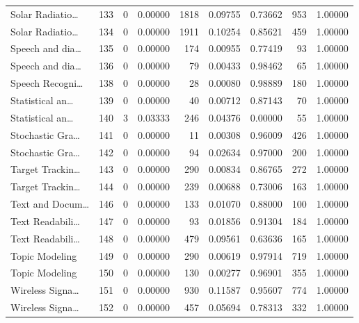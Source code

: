 \begin{table}
\begin{tabular}{lrrrrrrrr}
Solar Radiatio… & 133 & 0 & 0.00000 & 1818 & 0.09755 & 0.73662 & 953 & 1.00000 \\
Solar Radiatio… & 134 & 0 & 0.00000 & 1911 & 0.10254 & 0.85621 & 459 & 1.00000 \\
Speech and dia… & 135 & 0 & 0.00000 & 174 & 0.00955 & 0.77419 & 93 & 1.00000 \\
Speech and dia… & 136 & 0 & 0.00000 & 79 & 0.00433 & 0.98462 & 65 & 1.00000 \\
Speech Recogni… & 138 & 0 & 0.00000 & 28 & 0.00080 & 0.98889 & 180 & 1.00000 \\
Statistical an… & 139 & 0 & 0.00000 & 40 & 0.00712 & 0.87143 & 70 & 1.00000 \\
Statistical an… & 140 & 3 & 0.03333 & 246 & 0.04376 & 0.00000 & 55 & 1.00000 \\
Stochastic Gra… & 141 & 0 & 0.00000 & 11 & 0.00308 & 0.96009 & 426 & 1.00000 \\
Stochastic Gra… & 142 & 0 & 0.00000 & 94 & 0.02634 & 0.97000 & 200 & 1.00000 \\
Target Trackin… & 143 & 0 & 0.00000 & 290 & 0.00834 & 0.86765 & 272 & 1.00000 \\
Target Trackin… & 144 & 0 & 0.00000 & 239 & 0.00688 & 0.73006 & 163 & 1.00000 \\
Text and Docum… & 146 & 0 & 0.00000 & 133 & 0.01070 & 0.88000 & 100 & 1.00000 \\
Text Readabili… & 147 & 0 & 0.00000 & 93 & 0.01856 & 0.91304 & 184 & 1.00000 \\
Text Readabili… & 148 & 0 & 0.00000 & 479 & 0.09561 & 0.63636 & 165 & 1.00000 \\
Topic Modeling & 149 & 0 & 0.00000 & 290 & 0.00619 & 0.97914 & 719 & 1.00000 \\
Topic Modeling & 150 & 0 & 0.00000 & 130 & 0.00277 & 0.96901 & 355 & 1.00000 \\
Wireless Signa… & 151 & 0 & 0.00000 & 930 & 0.11587 & 0.95607 & 774 & 1.00000 \\
Wireless Signa… & 152 & 0 & 0.00000 & 457 & 0.05694 & 0.78313 & 332 & 1.00000 \\
\bottomrule
\end{tabular}
\end{table}
